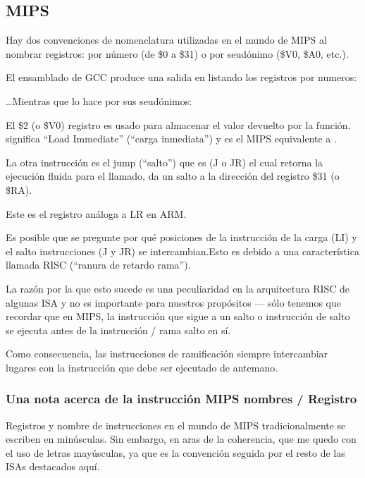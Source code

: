 \subsection{MIPS}

\label{MIPS_leaf_function_ex1}
Hay dos convenciones de nomenclatura utilizadas en el mundo de MIPS al nombrar registros: por número (de \$0 a \$31) o por seudónimo (\$V0, \$A0, etc.).

El ensamblado de GCC produce una salida en listando los registros por numeros:



\dots Mientras que \IDA lo hace por sus seudónimos:



El \$2 (o \$V0) registro es usado para almacenar el valor devuelto por la función.
 significa ``Load Immediate'' (``carga inmediata'') y es el MIPS equivalente a \MOV.

La otra instrucción es el jump (``salto'') que es  (J o JR) el cual retorna la ejecución fluida para el llamado, da un salto a la dirección del registro \$31 (o \$RA).

Este es el registro análoga a \ac{LR} en ARM.

Es posible que se pregunte por qué posiciones de la instrucción de la carga (LI) y el salto instrucciones (J y JR) se intercambian.Esto es debido a una característica llamada RISC (``ranura de retardo rama'').

La razón por la que esto sucede es una peculiaridad en la arquitectura RISC de algunas ISA y no es importante para nuestros propósitos --– sólo tenemos que recordar que en MIPS, la instrucción que sigue a un salto o instrucción de salto se ejecuta antes de la instrucción / rama salto en sí.

Como consecuencia, las instrucciones de ramificación siempre intercambiar lugares con la instrucción que debe ser ejecutado de antemano.

\subsubsection{Una nota acerca de la instrucción MIPS nombres / Registro}

Registros y nombre de instrucciones en el mundo de MIPS tradicionalmente se escriben en minúsculas.
Sin embargo, en aras de la  coherencia, que me quedo con el uso de letras mayúsculas, ya que es la convención seguida por el resto de las ISAs destacados aquí.


